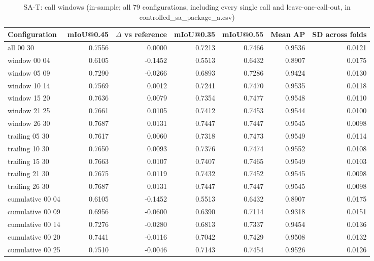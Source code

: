 \begin{table}[H]\centering\scriptsize\setlength{\tabcolsep}{3pt}
\begin{tabular}{>{\raggedright\arraybackslash}p{3.22cm}rrrrrr}
\toprule
Configuration & mIoU@0.45 & $\Delta$ vs reference & mIoU@0.35 & mIoU@0.55 & Mean AP & SD across folds \\
\midrule
all 00 30 & 0.7556 & 0.0000 & 0.7213 & 0.7466 & 0.9536 & 0.0121 \\
window 00 04 & 0.6105 & -0.1452 & 0.5513 & 0.6432 & 0.8907 & 0.0175 \\
window 05 09 & 0.7290 & -0.0266 & 0.6893 & 0.7286 & 0.9424 & 0.0130 \\
window 10 14 & 0.7569 & 0.0012 & 0.7241 & 0.7470 & 0.9535 & 0.0118 \\
window 15 20 & 0.7636 & 0.0079 & 0.7354 & 0.7477 & 0.9548 & 0.0110 \\
window 21 25 & 0.7661 & 0.0105 & 0.7412 & 0.7453 & 0.9544 & 0.0100 \\
window 26 30 & 0.7687 & 0.0131 & 0.7447 & 0.7447 & 0.9545 & 0.0098 \\
trailing 05 30 & 0.7617 & 0.0060 & 0.7318 & 0.7473 & 0.9549 & 0.0114 \\
trailing 10 30 & 0.7650 & 0.0093 & 0.7376 & 0.7474 & 0.9552 & 0.0108 \\
trailing 15 30 & 0.7663 & 0.0107 & 0.7407 & 0.7465 & 0.9549 & 0.0103 \\
trailing 21 30 & 0.7675 & 0.0119 & 0.7432 & 0.7452 & 0.9545 & 0.0098 \\
trailing 26 30 & 0.7687 & 0.0131 & 0.7447 & 0.7447 & 0.9545 & 0.0098 \\
cumulative 00 04 & 0.6105 & -0.1452 & 0.5513 & 0.6432 & 0.8907 & 0.0175 \\
cumulative 00 09 & 0.6956 & -0.0600 & 0.6390 & 0.7114 & 0.9318 & 0.0151 \\
cumulative 00 14 & 0.7276 & -0.0280 & 0.6813 & 0.7337 & 0.9454 & 0.0136 \\
cumulative 00 20 & 0.7441 & -0.0116 & 0.7042 & 0.7429 & 0.9508 & 0.0132 \\
cumulative 00 25 & 0.7510 & -0.0046 & 0.7143 & 0.7454 & 0.9526 & 0.0126 \\
\bottomrule
\end{tabular}
\caption{SA-T: call windows (in-sample; all 79 configurations, including every single call and leave-one-call-out, in controlled\_\allowbreak{}sa\_\allowbreak{}package\_\allowbreak{}a.csv)}\label{tab:a5_sa_t}
\end{table}
